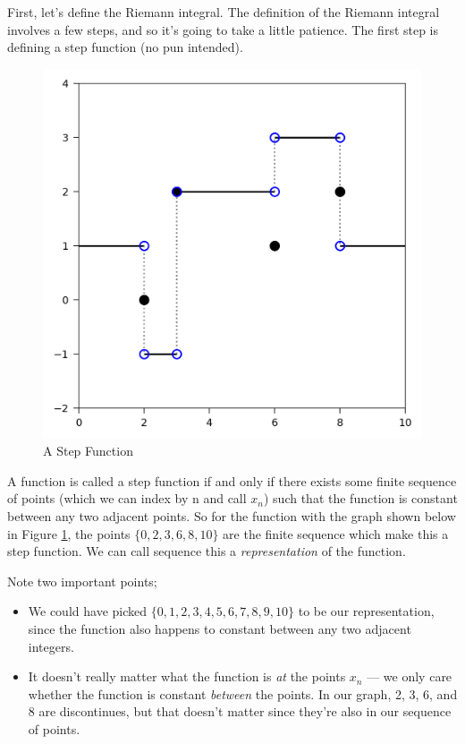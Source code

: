 First, let's define the Riemann integral. The definition of the Riemann integral involves a few steps, and so it's going to take a little patience. The first step is defining a step function (no pun intended).
%
\begin{figure}[h]
	\centering
	\includegraphics{Code/Step.png}
	\caption{A Step Function}
	\label{fig:step}
\end{figure}

A function is called a step function if and only if there exists some finite sequence of points (which we can index by n and call $x_n$) such that the function is constant between any two adjacent points. So for the function with the graph shown below in Figure \ref{fig:step}, the points $\{0, 2, 3, 6, 8, 10\}$ are the finite sequence which make this a step function. We can call sequence this a \emph{representation} of the function. 

Note two important points;
\begin{itemize}
	\item We could have picked $\{0, 1, 2, 3, 4, 5, 6, 7, 8, 9, 10\}$ to be our representation, since the function also happens to constant between any two adjacent integers. 
	\item It doesn't really matter what the function is {\em at} the points $x_n$ --- we only care whether the function is constant {\em between} the points. In our graph, 2, 3, 6, and 8 are discontinues, but that doesn't matter since they're also in our sequence of points. 
\end{itemize}

